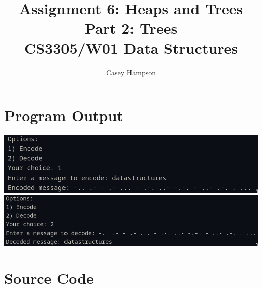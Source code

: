 \documentclass{article}
\title{Assignment 6: Heaps and Trees \\[5pt] Part 2: Trees \\[8pt] CS3305/W01 Data Structures}
\author{Casey Hampson}
\begin{document}
\maketitle


\section*{Program Output}

\begin{center}
\includegraphics[width=0.8\linewidth]{res/1.png}
\includegraphics[width=0.8\linewidth]{res/2.png}
\end{center}



\pagebreak
\section*{Source Code}
\inputminted{java}{./P2.java}
\end{document}
